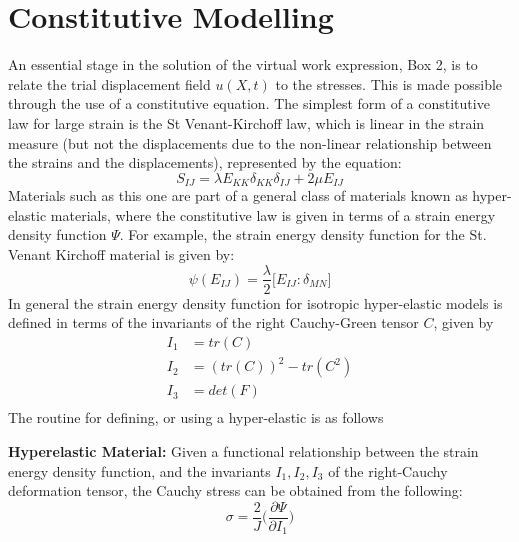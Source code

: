 \section{Constitutive Modelling}
An essential stage in the solution of the virtual work expression, Box 2, is to relate the trial displacement field $u(X,t)$ to the stresses. This is made possible through the use of a constitutive equation. The simplest form of a constitutive law for large strain is the St Venant-Kirchoff law, which is linear in the strain measure (but not the displacements due to the non-linear relationship between the strains and the displacements), represented by the equation:
\begin{equation}
S_{IJ} = \lambda E_{KK}\delta_{KK} \delta_{IJ} + 2\mu E_{IJ}
\end{equation}
Materials such as this one are part of a general class of materials known as hyper-elastic materials, where the constitutive law is given in terms of a strain energy density function $\Psi$. For example, the strain energy density function for the St. Venant Kirchoff material is given by:
\begin{equation}
\psi(E_{IJ}) = \frac{\lambda}{2}\big[E_{IJ} : \delta_{MN} \big]
\end{equation}
In general the strain energy density function for isotropic hyper-elastic models is defined in terms of the invariants of the right Cauchy-Green tensor $C$, given by
\begin{align*}
I_1 &= tr(C) \\
I_2 &= (tr(C))^2 - tr(C^2)\\
I_3 &= det(F)\\
\end{align*}
The routine for defining, or using a hyper-elastic is as follows
\begin{tcolorbox}
\textbf{Hyperelastic Material:}
Given a functional relationship between the strain energy density function, and the invariants $I_1,I_2,I_3$ of the right-Cauchy deformation tensor, the Cauchy stress can be obtained from the following:
\begin{equation}
\sigma = \frac{2}{J}\bigg(\frac{\partial \Psi}{\partial I_1}\bigg)
\end{equation}

\end{tcolorbox}


